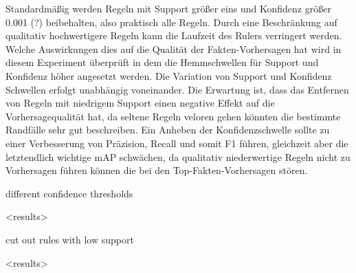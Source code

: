 Standardmäßig werden Regeln mit Support größer eins und Konfidenz größer 0.001 (?) beibehalten, also praktisch alle Regeln. Durch eine Beschränkung auf qualitativ hochwertigere Regeln kann die Laufzeit des Rulers verringert werden. Welche Auswirkungen dies auf die Qualität der Fakten-Vorhersagen hat wird in diesem Experiment überprüft in dem die Hemmschwellen für Support und Konfidenz höher angesetzt werden. Die Variation von Support und Konfidenz Schwellen erfolgt unabhängig voneinander. Die Erwartung ist, dass das Entfernen von Regeln mit niedrigem Support einen negative Effekt auf die Vorhersagequalität hat, da seltene Regeln veloren gehen könnten die bestimmte Randfälle sehr gut beschreiben. Ein Anheben der Konfidenzschwelle sollte zu einer Verbesserung von Präzision, Recall und somit F1 führen, gleichzeit aber die letztendlich wichtige mAP schwächen, da qualitativ niederwertige Regeln nicht zu Vorhersagen führen können die bei den Top-Fakten-Vorhersagen stören.

different confidence thresholds

<results>

cut out rules with low support

<results>
